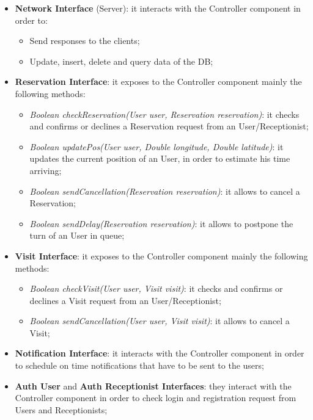 \begin{itemize}
\item \textbf{Network Interface} (Server): it interacts with the Controller component in order to:
\begin{itemize}
\item Send responses to the clients;
\item Update, insert, delete and query data of the DB;
\end{itemize}

\item \textbf{Reservation Interface}: it exposes to the Controller component mainly the following methods:
\begin{itemize}
\item \textit{Boolean checkReservation(User user, Reservation reservation)}: it checks and confirms or declines a Reservation request from an User/Receptionist;
\item \textit{Boolean updatePos(User user, Double longitude, Double latitude)}: it updates the current position of an User, in order to estimate his time arriving;
\item \textit{Boolean sendCancellation(Reservation reservation)}: it allows to cancel a Reservation; 
\item \textit{Boolean sendDelay(Reservation reservation)}: it allows to postpone the turn of an User in queue;
\end{itemize}



\item \textbf{Visit Interface}: it exposes to the Controller component mainly the following methods:
\begin{itemize}
\item \textit{Boolean checkVisit(User user, Visit visit)}: it checks and confirms or declines a Visit request from an User/Receptionist;
\item \textit{Boolean sendCancellation(User user, Visit visit)}: it allows to cancel a Visit; 
\end{itemize}


\item \textbf{Notification Interface}: it interacts with the Controller component in order to schedule on time notifications that have to be sent to the users;

\item \textbf{Auth User} and \textbf{Auth Receptionist Interfaces}: they interact with the Controller component in order to check login and registration request from Users and Receptionists;


\end{itemize}
